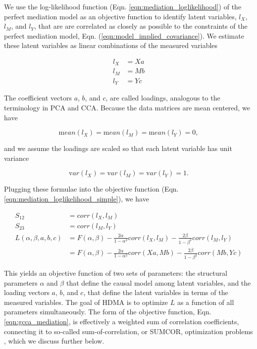 \documentclass[
]{article}
\begin{document}
We use the log-likelihood function (Eqn.
\ref{eqn:mediation_loglikelihood}) of the perfect mediation model as an
objective function to identify latent variables, \(l_X\), \(l_M\), and
\(l_Y\), that are are correlated as closely as possible to the
constraints of the perfect mediation model, Eqn.
(\ref{eqn:model_implied_covariance}). We estimate these latent variables
as linear combinations of the measured variables

\begin{align}
l_X &= Xa \\
l_M &= Mb \\
l_Y &= Yc
\end{align}

The coefficient vectors \(a\), \(b\), and \(c\), are called loadings,
analogous to the terminology in PCA and CCA. Because the data matrices
are mean centered, we have

\begin{equation}
{\mathrm mean}(l_X) = {\mathrm mean}(l_M) = {\mathrm mean}(l_Y) = 0,
\end{equation}

and we assume the loadings are scaled so that each latent variable has
unit variance

\begin{equation}
{\mathrm var}(l_X) = {\mathrm var}(l_M) = {\mathrm var}(l_Y) = 1.
\end{equation}

Plugging these formulae into the objective function (Eqn.
\ref{eqn:mediation_loglikelihood_simple}), we have

\begin{align}
S_{12} &= {\mathrm corr}\left(l_X, l_M\right)\\
S_{23} &= {\mathrm corr}\left(l_M, l_Y\right)\\
\label{eqn:gcca_mediation}
L(\alpha, \beta, a,b,c) &= F(\alpha, \beta) - \frac{2\alpha}{1-\alpha^2} {\mathrm corr}\left(l_X, l_M\right) - \frac{2\beta}{1-\beta^2} {\mathrm corr}\left(l_M, l_Y\right) \\ 
&= F(\alpha, \beta) - \frac{2\alpha}{1-\alpha^2} {\mathrm corr}\left(Xa, Mb\right) - \frac{2\beta}{1-\beta^2} {\mathrm corr}\left(Mb, Yc\right)
\end{align}

This yields an objective function of two sets of parameters: the
structural parameters \(\alpha\) and \(\beta\) that define the causal
model among latent variables, and the loading vectors \(a\), \(b\), and
\(c\), that define the latent variables in terms of the measured
variables. The goal of HDMA is to optimize \(L\) as a function of all
parameters simultaneously. The form of the objective function, Eqn.
\ref{eqn:gcca_mediation}, is effectively a weighted sum of correlation
coefficients, connecting it to so-called sum-of-correlation, or SUMCOR,
optimization problems \cite{tenenhaus2011regularized}, which we discuss
further below.
\end{document}
